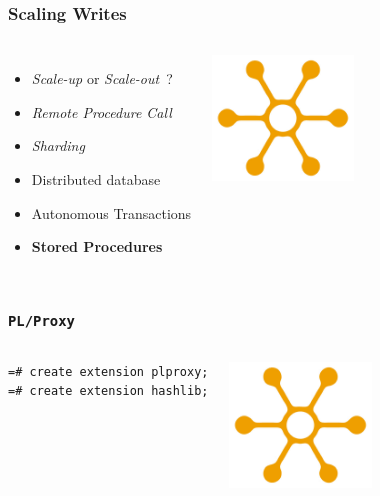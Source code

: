 \documentclass[english]{beamer}
\begin{document}
\begin{frame}[fragile]
  \frametitle{Scaling Writes}

  \linebreak
  \linebreak

\begin{columns}[c]

  \begin{itemize}
   \item<1-> \textit{Scale-up} or \textit{Scale-out} ?
   \item<2-> \textit{Remote Procedure Call}
   \item<3-> \textit{Sharding}
   \item<3-> Distributed database
   \item<4-> Autonomous Transactions
   \item<5-> \textbf{Stored Procedures}
  \end{itemize}  

\includegraphics[height=9em]{distribution.jpg}
\end{columns}
\end{frame}

\begin{frame}[fragile]
  \frametitle{\texttt{PL/Proxy}}
  

\begin{columns}[c]

  \begin{example}
\begin{verbatim}
=# create extension plproxy;
=# create extension hashlib;
\end{verbatim}
  \end{example}

\includegraphics[height=9em]{distribution.jpg}
\end{columns}
\end{frame}
\end{document}
